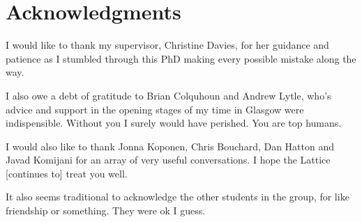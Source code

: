 \documentclass[a4paper,11pt,twoside]{ThesisStyle}
\begin{document}


\section*{Acknowledgments}

I would like to thank my supervisor, Christine Davies, for her guidance and patience as I stumbled through this PhD making every possible mistake along the way. 

I also owe a debt of gratitude to Brian Colquhoun and Andrew Lytle, who's advice and support in the opening stages of my time in Glasgow were indispensible. Without you I surely would have perished. You are top humans.

I would also like to thank Jonna Koponen, Chris Bouchard, Dan Hatton and Javad Komijani for an array of very useful conversations. I hope the Lattice [continues to] treat you well.

It also seems traditional to acknowledge the other students in the group, for like friendship or something. They were ok I guess. 

\newpage

\tableofcontents
\mainmatter







% 

\listoffigures
%  
\listoftables




\end{document}
